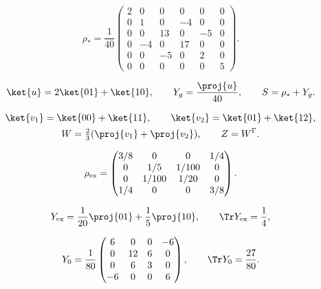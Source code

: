 
\begin{equation}
 \rho_*=\frac1{40}
 \begin{pmatrix}
 2&0&0&0&0&0\\
 0&1&0&-4&0&0\\
 0&0&13&0&-5&0\\
 0&-4&0&17&0&0\\
 0&0&-5&0&2&0\\
 0&0&0&0&0&5
 \end{pmatrix}.
 \label{eq:2x3-counterexample}
\end{equation}

\begin{equation}
 \ket{u}=2\ket{01}+\ket{10},\qquad
 Y_g=\frac{\proj{u}}{40},\qquad S=\rho_*+Y_g.
 \label{eq:2x3-noise}
\end{equation}

\begin{equation}
 \begin{gathered}
 \ket{v_1}=\ket{00}+\ket{11},\qquad
 \ket{v_2}=\ket{01}+\ket{12},\\
 W=\tfrac23(\proj{v_1}+\proj{v_2}),\qquad Z=W^\Gamma .
 \end{gathered}
 \label{eq:2x3-witness}
\end{equation}

\begin{equation}
 \rho_{\rm ex}=
 \begin{pmatrix}
  3/8&0&0&1/4\\
  0&1/5&1/100&0\\
  0&1/100&1/20&0\\
  1/4&0&0&3/8
 \end{pmatrix}.
 \label{eq:jmr-counterexample-state}
\end{equation}

\begin{equation}
 Y_{\rm ex}=\frac1{20}\proj{01}+\frac15\proj{10},
 \qquad \Tr Y_{\rm ex}=\frac14,
 \label{eq:jmr-counterexample-primal}
\end{equation}

\begin{equation}
 Y_0=\frac1{80}
 \begin{pmatrix}
 6&0&0&-6\\0&12&6&0\\0&6&3&0\\-6&0&0&6
 \end{pmatrix},\qquad \Tr Y_0=\frac{27}{80}.
 \label{eq:jmr-old-noise-matrix}
\end{equation}
